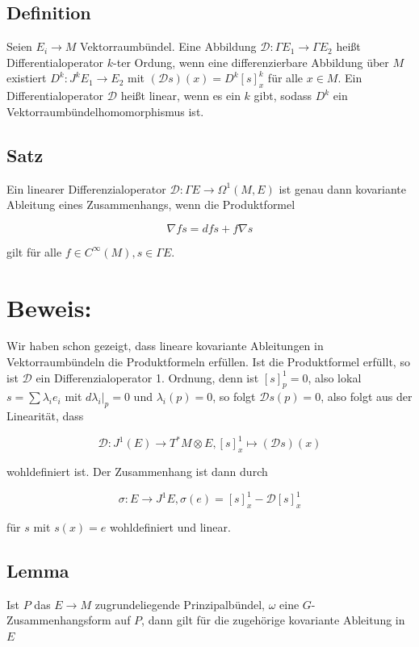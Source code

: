 \documentclass[10pt, letterpaper]{article}
\begin{document}
\subsection*{Definition}
Seien $E_{i} \rightarrow M$ Vektorraumbündel. Eine Abbildung $\mathcal{D}: \Gamma E_{1} \rightarrow \Gamma E_{2}$ heißt Differentialoperator $k$-ter Ordung, wenn eine differenzierbare Abbildung über $M$ existiert $D^{k}: J^{k} E_{1} \rightarrow E_{2}$ mit $(\mathcal{D} s)(x)=D^{k}[s]_{x}^{k}$ für alle $x \in M$. Ein Differentialoperator $\mathcal{D}$ heißt linear, wenn es ein $k$ gibt, sodass $D^{k}$ ein Vektorraumbündelhomomorphismus ist.

\subsection*{Satz}
Ein linearer Differenzialoperator $\mathcal{D}: \Gamma E \rightarrow \Omega^{1}(M, E)$ ist genau dann kovariante Ableitung eines Zusammenhangs, wenn die Produktformel

$$
\nabla f s=d f s+f \nabla s
$$

gilt für alle $f \in C^{\infty}(M), s \in \Gamma E$.

\section*{Beweis:}
Wir haben schon gezeigt, dass lineare kovariante Ableitungen in Vektorraumbündeln die Produktformeln erfüllen. Ist die Produktformel erfüllt, so ist $\mathcal{D}$ ein Differenzialoperator 1. Ordnung, denn ist $[s]_{p}^{1}=0$, also lokal $s=\sum \lambda_{i} e_{i}$ mit $\left.d \lambda_{i}\right|_{p}=0$ und $\lambda_{i}(p)=0$, so folgt $\mathcal{D} s(p)=0$, also folgt aus der Linearität, dass

$$
\mathcal{D}: J^{1}(E) \rightarrow T^{*} M \otimes E,[s]_{x}^{1} \mapsto(\mathcal{D} s)(x)
$$

wohldefiniert ist. Der Zusammenhang ist dann durch

$$
\sigma: E \rightarrow J^{1} E, \sigma(e)=[s]_{x}^{1}-\mathcal{D}[s]_{x}^{1}
$$

für $s$ mit $s(x)=e$ wohldefiniert und linear.

\subsection*{Lemma}
Ist $P$ das $E \rightarrow M$ zugrundeliegende Prinzipalbündel, $\omega$ eine $G$-Zusammenhangsform auf $P$, dann gilt für die zugehörige kovariante Ableitung in $E$
\end{document}
